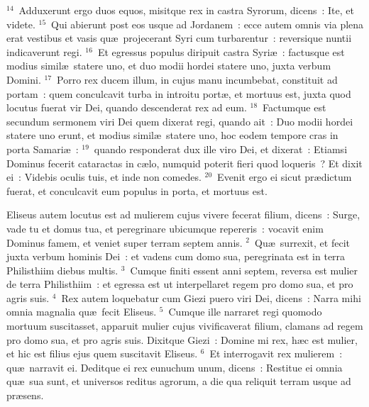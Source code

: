 ${}^{14}$~Adduxerunt ergo duos equos, misitque rex in castra Syrorum, dicens~: Ite, et videte.
${}^{15}$~Qui abierunt post eos usque ad Jordanem~: ecce autem omnis via plena erat vestibus et vasis qu\ae\ projecerant Syri cum turbarentur~: reversique nuntii indicaverunt regi.
${}^{16}$~Et egressus populus diripuit castra Syri\ae~: factusque est modius simil\ae\ statere uno, et duo modii hordei statere uno, juxta verbum Domini.
${}^{17}$~Porro rex ducem illum, in cujus manu incumbebat, constituit ad portam~: quem conculcavit turba in introitu port\ae , et mortuus est, juxta quod locutus fuerat vir Dei, quando descenderat rex ad eum.
${}^{18}$~Factumque est secundum sermonem viri Dei quem dixerat regi, quando ait~: Duo modii hordei statere uno erunt, et modius simil\ae\ statere uno, hoc eodem tempore cras in porta Samari\ae~:
${}^{19}$~quando responderat dux ille viro Dei, et dixerat~: Etiamsi Dominus fecerit cataractas in c\ae lo, numquid poterit fieri quod loqueris~? Et dixit ei~: Videbis oculis tuis, et inde non comedes.
${}^{20}$~Evenit ergo ei sicut pr\ae dictum fuerat, et conculcavit eum populus in porta, et mortuus est.

\lettrine[lines=10,image=true,loversize=0.05,lraise=-0.03]{E}{}liseus autem locutus est ad mulierem cujus vivere fecerat filium, dicens~: Surge, vade tu et domus tua, et peregrinare ubicumque repereris~: vocavit enim Dominus famem, et veniet super terram septem annis.
${}^{2}$~Qu\ae\ surrexit, et fecit juxta verbum hominis Dei~: et vadens cum domo sua, peregrinata est in terra Philisthiim diebus multis.
${}^{3}$~Cumque finiti essent anni septem, reversa est mulier de terra Philisthiim~: et egressa est ut interpellaret regem pro domo sua, et pro agris suis.
${}^{4}$~Rex autem loquebatur cum Giezi puero viri Dei, dicens~: Narra mihi omnia magnalia qu\ae\ fecit Eliseus.
${}^{5}$~Cumque ille narraret regi quomodo mortuum suscitasset, apparuit mulier cujus vivificaverat filium, clamans ad regem pro domo sua, et pro agris suis. Dixitque Giezi~: Domine mi rex, h\ae c est mulier, et hic est filius ejus quem suscitavit Eliseus.
${}^{6}$~Et interrogavit rex mulierem~: qu\ae\ narravit ei. Deditque ei rex eunuchum unum, dicens~: Restitue ei omnia qu\ae\ sua sunt, et universos reditus agrorum, a die qua reliquit terram usque ad pr\ae sens.


